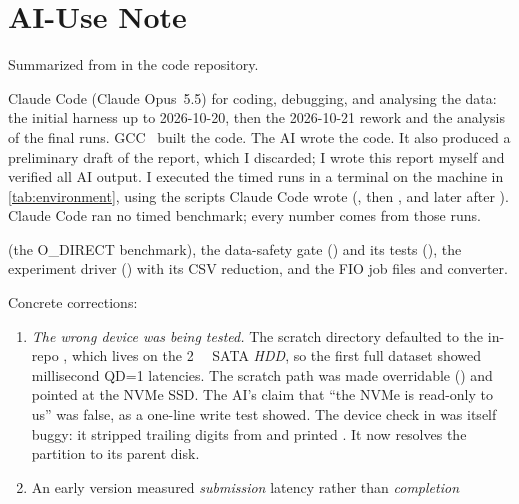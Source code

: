 \section{AI-Use Note}\label{sec:ai-use}

Summarized from  in the code repository.

\begin{description}[style=nextline]
  \item[Tools used] Claude Code (Claude Opus~5.5) for coding, debugging, and analysing the data: the
        initial harness up to 2026-10-20, then the 2026-10-21 rework and the analysis of the final runs.
        GCC~\sysGCC{} built the code. The AI wrote the code. It also produced a preliminary draft of the
        report, which I discarded; I wrote this report myself and verified all AI output. I executed the
        timed runs in a terminal on the machine in \cref{tab:environment}, using the scripts
        Claude Code wrote (, then , and later
         after ). Claude Code ran no timed benchmark;
        every number comes from those runs.
  \item[What they helped generate]  (the O\_DIRECT  benchmark), the
        data-safety gate () and its tests (), the experiment driver
        () with its CSV reduction, and the FIO job files and converter.
  \item[What was independently modified, tested, or rejected] Concrete corrections:
        \begin{enumerate}[nosep]
          \item \emph{The wrong device was being tested.} The scratch directory defaulted to the in-repo
                , which lives on the \qty{2}{\tera\byte} SATA \emph{HDD}, so the
                first full dataset showed millisecond QD=1 latencies. The scratch path was made
                overridable () and pointed at the NVMe SSD. The AI's claim that
                \enquote{the NVMe is read-only to us} was false, as a one-line write test showed. The
                device check in  was itself buggy: it stripped trailing digits from
                 and printed . It now resolves the partition to its
                parent disk.
          \item An early version measured \emph{submission} latency rather than \emph{completion}

\end{enumerate}
\end{description}
